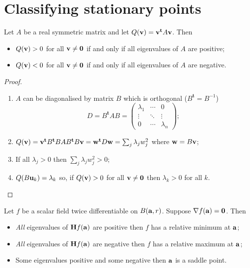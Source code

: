 \section{Classifying stationary points}

\begin{theorem}
    Let \(A\) be a real symmetric matrix and let
    \(Q(\vv) =  \vv^{\mathbf{t}} A  \vv  \).
    Then
    \begin{itemize}
        \item \(Q(\vv) > 0\) for all \(\vv \neq \mathbf{0}\) if and only if all eigenvalues of \(A\) are positive;
        \item \(Q(\vv) < 0\) for all \(\vv \neq \mathbf{0}\) if and only if all eigenvalues of \(A\) are negative.
    \end{itemize}
\end{theorem}

\begin{proof}
    \begin{enumerate}
        \item \(A\) can be diagonalised by  matrix \(B\)  which is orthogonal (\(B^{\mathbf{t}}=B^{-1}\))
              \[
                  D = B^{\mathbf{t}} A B =
                  \begin{pmatrix}
                      \lambda_1 & \cdots & 0         \\
                      \vdots    & \ddots & \vdots    \\
                      0         & \cdots & \lambda_n
                  \end{pmatrix};
              \]
              \vspace{-1em}
        \item \(Q(\vv) = \vv^{\mathbf{t}} B^{\mathbf{t}} B A B^{\mathbf{t}} B \vv  = \ww^{\mathbf{t}} D \ww = \sum_{j} \lambda_j w_j^2  \) where \(\ww = B \vv\);
        \item If all \(\lambda_j >0\) then \( \sum_{j} \lambda_j w_j^2  >0\);
        \item \(Q(B \uu_k ) = \lambda_k\) so, if \(Q(\vv) > 0\) for all \(\vv \neq \mathbf{0}\) then \(\lambda_k>0\) for all \(k\). \qedhere
    \end{enumerate}
\end{proof}


\begin{theorem}
    Let \(f\) be a scalar field twice differentiable on \(B(\aa,r)\).
    Suppose  \(\nabla f(\aa) = \mathbf{0}\).
    Then
    \begin{itemize}
        \item \emph{All} eigenvalues of \(\mathbf{H} f (\aa)\) are positive then \(f\) has a relative minimum at \(\aa\);
        \item \emph{All} eigenvalues of \(\mathbf{H} f (\aa)\) are negative then \(f\) has a relative maximum at \(\aa\);
        \item Some eigenvalues positive and some negative then \(\aa\) is a saddle point.
    \end{itemize}
\end{theorem}

